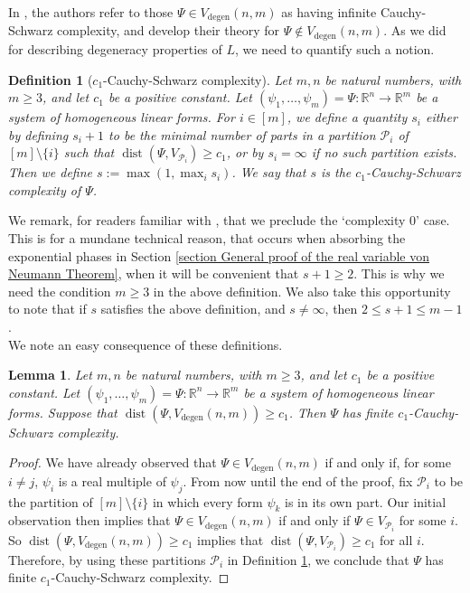 \documentclass[12pt,a4paper,twoside,reqno]{amsart}
\newtheorem{Lemma}[Theorem]{Lemma}
\newtheorem{Definition}[Theorem]{Definition}
\newcommand{\degen}{\operatorname{degen}}
\numberwithin{equation}{section}
\begin{document}
In \cite[Definition 1.5]{GT10}, the authors refer to those $\Psi\in V_{\degen}(n,m)$ as having infinite Cauchy-Schwarz complexity, and develop their theory for $\Psi\notin V_{\degen}(n,m)$. As we did for describing degeneracy properties of $L$, we need to quantify such a notion. 

\begin{Definition}[$c_1$-Cauchy-Schwarz complexity]
\label{Definition Cauchy Schwarz complexity}
Let $m,n$ be natural numbers, with $m\geqslant 3$, and let $c_1$ be a positive constant. Let $(\psi_1,\dots,\psi_m) = \Psi:\mathbb{R}^n \longrightarrow \mathbb{R}^m$ be a system of homogeneous linear forms. For $i\in [ m]$, we define a quantity $s_i$ either by defining $s_i+1$ to be the minimal number of parts in a partition $\mathcal{P}_i$ of $[m]\setminus \{i\}$ such that $\operatorname{dist}(\Psi,V_{\mathcal{P}_i})\geqslant c_1$, or by $s_i = \infty$ if no such partition exists. Then we define $s:=\operatorname{max}(1,\operatorname{max}_i s_i)$. We say that $s$ is the $c_1$-Cauchy-Schwarz complexity of $\Psi$. 
\end{Definition}
\noindent We remark, for readers familiar with \cite{GT10}, that we preclude the `complexity $0$' case. This is for a mundane technical reason, that occurs when absorbing the exponential phases in Section \ref{section General proof of the real variable von Neumann Theorem}, when it will be convenient that $s+1\geqslant 2$. This is why we need the condition $m\geqslant 3$ in the above definition. We also take this opportunity to note that if $s$ satisfies the above definition, and $s\neq\infty$, then $2\leqslant s+1\leqslant m-1$. \\

We note an easy consequence of these definitions.
\begin{Lemma}
\label{Lemma different forms of non degen}
Let $m,n$ be natural numbers, with $m\geqslant 3$, and let $c_1$ be a positive constant. Let $(\psi_1,\dots,\psi_m) = \Psi:\mathbb{R}^n\longrightarrow \mathbb{R}^m$ be a system of homogeneous linear forms. Suppose that $\operatorname{dist}(\Psi, V_{\degen}(n,m))\geqslant c_1$. Then $\Psi$ has finite $c_1$-Cauchy-Schwarz complexity.
\end{Lemma}
\begin{proof}
We have already observed that $\Psi \in V_{\degen}(n,m)$ if and only if, for some $i\neq j$, $\psi_i$ is a real multiple of $\psi_j$. From now until the end of the proof, fix $\mathcal{P}_i$ to be the partition of $[m]\setminus \{i\}$ in which every form $\psi_k$ is in its own part. Our initial observation then implies that $\Psi\in V_{\degen}(n,m)$ if and only if $\Psi\in V_{\mathcal{P}_i}$ for some $i$. So $\operatorname{dist}(\Psi, V_{\degen}(n,m))\geqslant c_1$ implies that $\operatorname{dist}(\Psi, V_{\mathcal{P}_i})\geqslant c_1$ for all $i$. Therefore, by using these partitions $\mathcal{P}_i$ in Definition \ref{Definition Cauchy Schwarz complexity}, we conclude that $\Psi$ has finite $c_1$-Cauchy-Schwarz complexity. 
\end{proof}
\end{document}
